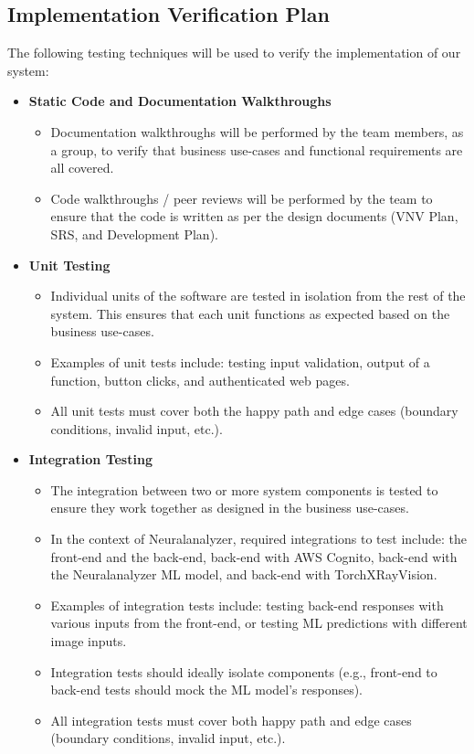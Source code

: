 \documentclass[12pt, titlepage]{article}
\begin{document}
\subsection{Implementation Verification Plan}
The following testing techniques will be used to verify the implementation of our system:
\begin{itemize}

  \item[] \textbf{Static Code and Documentation Walkthroughs}
  \begin{itemize}
    \item Documentation walkthroughs will be performed by the team members, as a group, to verify that business use-cases and functional requirements are all covered.
    \item Code walkthroughs / peer reviews will be performed by the team to ensure that the code is written as per the design documents (VNV Plan, SRS, and Development Plan).
  \end{itemize}

  \item[] \textbf{Unit Testing}
  \begin{itemize}
    \item Individual units of the software are tested in isolation from the rest of the system. This ensures that each unit functions as expected based on the business use-cases.
    \item Examples of unit tests include: testing input validation, output of a function, button clicks, and authenticated web pages.
    \item All unit tests must cover both the happy path and edge cases (boundary conditions, invalid input, etc.).
  \end{itemize}
  
  \item[] \textbf{Integration Testing}
  \begin{itemize}
    \item The integration between two or more system components is tested to ensure they work together as designed in the business use-cases.
    \item In the context of Neuralanalyzer, required integrations to test include: the front-end and the back-end, back-end with AWS Cognito, back-end with the Neuralanalyzer ML model, and back-end with TorchXRayVision.
    \item Examples of integration tests include: testing back-end responses with various inputs from the front-end, or testing ML predictions with different image inputs.
    \item Integration tests should ideally isolate components (e.g., front-end to back-end tests should mock the ML model's responses).
    \item All integration tests must cover both happy path and edge cases (boundary conditions, invalid input, etc.).
  \end{itemize}


\end{itemize}
\end{document}
